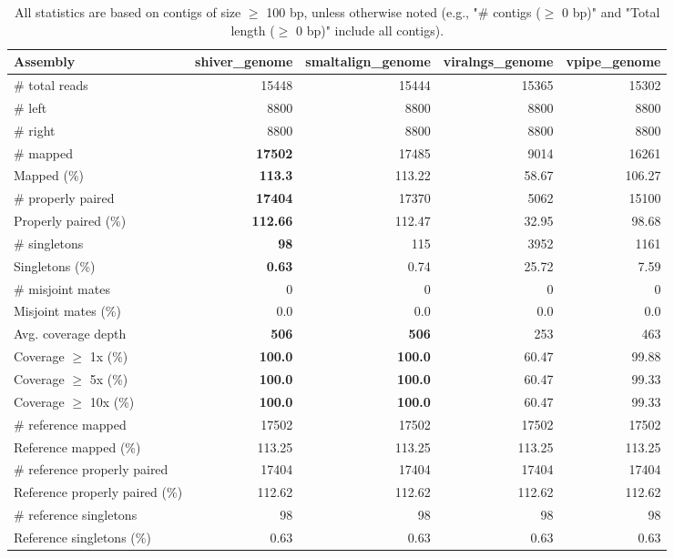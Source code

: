 \documentclass[12pt,a4paper]{article}
\begin{document}
\begin{table}[ht]
\begin{center}
\caption{All statistics are based on contigs of size $\geq$ 100 bp, unless otherwise noted (e.g., "\# contigs ($\geq$ 0 bp)" and "Total length ($\geq$ 0 bp)" include all contigs).}
\begin{tabular}{|l*{4}{|r}|}
\hline
Assembly & shiver\_genome & smaltalign\_genome & viralngs\_genome & vpipe\_genome \\ \hline
\# total reads & 15448 & 15444 & 15365 & 15302 \\ \hline
\# left & 8800 & 8800 & 8800 & 8800 \\ \hline
\# right & 8800 & 8800 & 8800 & 8800 \\ \hline
\# mapped & {\bf 17502} & 17485 & 9014 & 16261 \\ \hline
Mapped (\%) & {\bf 113.3} & 113.22 & 58.67 & 106.27 \\ \hline
\# properly paired & {\bf 17404} & 17370 & 5062 & 15100 \\ \hline
Properly paired (\%) & {\bf 112.66} & 112.47 & 32.95 & 98.68 \\ \hline
\# singletons & {\bf 98} & 115 & 3952 & 1161 \\ \hline
Singletons (\%) & {\bf 0.63} & 0.74 & 25.72 & 7.59 \\ \hline
\# misjoint mates & 0 & 0 & 0 & 0 \\ \hline
Misjoint mates (\%) & 0.0 & 0.0 & 0.0 & 0.0 \\ \hline
Avg. coverage depth & {\bf 506} & {\bf 506} & 253 & 463 \\ \hline
Coverage $\geq$ 1x (\%) & {\bf 100.0} & {\bf 100.0} & 60.47 & 99.88 \\ \hline
Coverage $\geq$ 5x (\%) & {\bf 100.0} & {\bf 100.0} & 60.47 & 99.33 \\ \hline
Coverage $\geq$ 10x (\%) & {\bf 100.0} & {\bf 100.0} & 60.47 & 99.33 \\ \hline
\# reference mapped & 17502 & 17502 & 17502 & 17502 \\ \hline
Reference mapped (\%) & 113.25 & 113.25 & 113.25 & 113.25 \\ \hline
\# reference properly paired & 17404 & 17404 & 17404 & 17404 \\ \hline
Reference properly paired (\%) & 112.62 & 112.62 & 112.62 & 112.62 \\ \hline
\# reference singletons & 98 & 98 & 98 & 98 \\ \hline
Reference singletons (\%) & 0.63 & 0.63 & 0.63 & 0.63 \\ \hline

\end{tabular}
\end{center}
\end{table}
\end{document}
